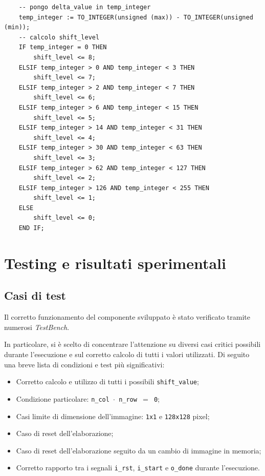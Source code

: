 \documentclass{article}
\begin{document}
\begin{verbatim}
    -- pongo delta_value in temp_integer
    temp_integer := TO_INTEGER(unsigned (max)) - TO_INTEGER(unsigned (min)); 
    -- calcolo shift_level
    IF temp_integer = 0 THEN
        shift_level <= 8;
    ELSIF temp_integer > 0 AND temp_integer < 3 THEN
        shift_level <= 7;
    ELSIF temp_integer > 2 AND temp_integer < 7 THEN
        shift_level <= 6;
    ELSIF temp_integer > 6 AND temp_integer < 15 THEN
        shift_level <= 5;
    ELSIF temp_integer > 14 AND temp_integer < 31 THEN
        shift_level <= 4;
    ELSIF temp_integer > 30 AND temp_integer < 63 THEN
        shift_level <= 3;
    ELSIF temp_integer > 62 AND temp_integer < 127 THEN
        shift_level <= 2;
    ELSIF temp_integer > 126 AND temp_integer < 255 THEN
        shift_level <= 1;
    ELSE
        shift_level <= 0;
    END IF;
\end{verbatim}
\vspace{1cm}

\section{Testing e risultati sperimentali} %
\subsection{Casi di test} %
Il corretto funzionamento del componente sviluppato è stato verificato tramite numerosi \emph{TestBench}.\par In particolare, si è scelto di concentrare l’attenzione su diversi casi critici possibili durante l’esecuzione e sul corretto calcolo di tutti i valori utilizzati. Di seguito una breve lista di condizioni e test più significativi:

\begin{itemize}
    \item   Corretto calcolo e utilizzo di tutti i possibili \texttt{shift\_value};
    \item   Condizione particolare: \texttt{n\_col $\cdot$ n\_row $=$ 0}\footnotemark ;
    \item   Casi limite di dimensione dell’immagine: \texttt{1x1} e \texttt{128x128} pixel;
    \item   Caso di reset dell’elaborazione;
    \item   Caso di reset dell’elaborazione seguito da un cambio di immagine in memoria;
    \item   Corretto rapporto tra i segnali \texttt{i\_rst}, \texttt{i\_start} e \texttt{o\_done} durante   l’esecuzione.
\end{itemize}
\end{document}
